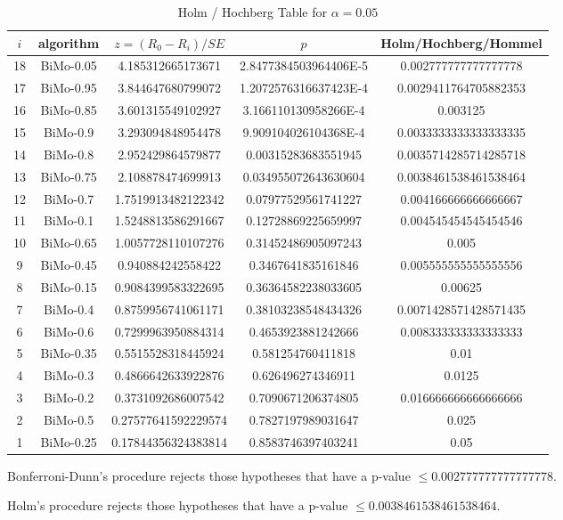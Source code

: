 \documentclass[a4paper,10pt]{article}
\begin{document}
\begin{landscape}
\begin{table}[!htp]
\centering\tiny
\caption{Holm / Hochberg Table for $\alpha=0.05$}
\begin{tabular}{ccccc}
$i$&algorithm&$z=(R_0 - R_i)/SE$&$p$&Holm/Hochberg/Hommel\\
\hline
18&BiMo-0.05&4.185312665173671&2.8477384503964406E-5&0.002777777777777778\\
17&BiMo-0.95&3.844647680799072&1.2072576316637423E-4&0.0029411764705882353\\
16&BiMo-0.85&3.601315549102927&3.166110130958266E-4&0.003125\\
15&BiMo-0.9&3.293094848954478&9.909104026104368E-4&0.0033333333333333335\\
14&BiMo-0.8&2.952429864579877&0.00315283683551945&0.0035714285714285718\\
13&BiMo-0.75&2.108878474699913&0.034955072643630604&0.0038461538461538464\\
12&BiMo-0.7&1.7519913482122342&0.07977529561741227&0.004166666666666667\\
11&BiMo-0.1&1.5248813586291667&0.12728869225659997&0.004545454545454546\\
10&BiMo-0.65&1.0057728110107276&0.31452486905097243&0.005\\
9&BiMo-0.45&0.940884242558422&0.3467641835161846&0.005555555555555556\\
8&BiMo-0.15&0.9084399583322695&0.36364582238033605&0.00625\\
7&BiMo-0.4&0.8759956741061171&0.38103238548434326&0.0071428571428571435\\
6&BiMo-0.6&0.7299963950884314&0.4653923881242666&0.008333333333333333\\
5&BiMo-0.35&0.5515528318445924&0.581254760411818&0.01\\
4&BiMo-0.3&0.4866642633922876&0.626496274346911&0.0125\\
3&BiMo-0.2&0.3731092686007542&0.7090671206374805&0.016666666666666666\\
2&BiMo-0.5&0.27577641592229574&0.7827197989031647&0.025\\
1&BiMo-0.25&0.17844356324383814&0.8583746397403241&0.05\\
\hline
\end{tabular}
\end{table}
Bonferroni-Dunn's procedure rejects those hypotheses that have a p-value $\le0.002777777777777778$.


Holm's procedure rejects those hypotheses that have a p-value $\le0.0038461538461538464$.



\end{landscape}
\end{document}
